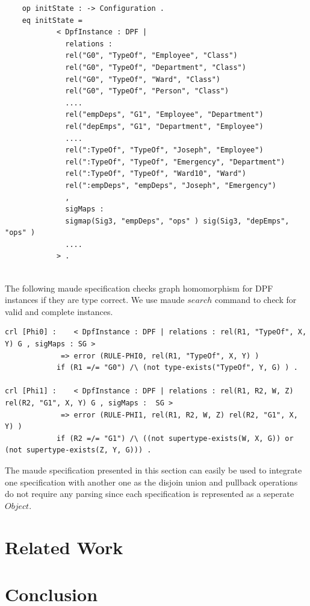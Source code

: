 \documentclass{eceasst}
\begin{document}
\tiny
\begin{verbatim}
	op initState : -> Configuration .
	eq initState = 
			< DpfInstance : DPF | 
			  relations : 
			  rel("G0", "TypeOf", "Employee", "Class")
			  rel("G0", "TypeOf", "Department", "Class")
			  rel("G0", "TypeOf", "Ward", "Class")
			  rel("G0", "TypeOf", "Person", "Class")
			  ....
			  rel("empDeps", "G1", "Employee", "Department")
			  rel("depEmps", "G1", "Department", "Employee")
			  ....			  
			  rel(":TypeOf", "TypeOf", "Joseph", "Employee") 
			  rel(":TypeOf", "TypeOf", "Emergency", "Department") 
			  rel(":TypeOf", "TypeOf", "Ward10", "Ward") 			  
			  rel(":empDeps", "empDeps", "Joseph", "Emergency") 			  
			  ,
			  sigMaps : 
			  sigmap(Sig3, "empDeps", "ops" ) sig(Sig3, "depEmps", "ops" )
			  ....
			> .
 
\end{verbatim}
\normalsize

The following maude specification checks graph homomorphism for DPF instances if they are type correct. We use maude $search$ command to check for valid and complete instances. 


\tiny
\begin{verbatim}
crl [Phi0] :	< DpfInstance : DPF | relations : rel(R1, "TypeOf", X, Y) G , sigMaps : SG > 
			 => error (RULE-PHI0, rel(R1, "TypeOf", X, Y) )
			if (R1 =/= "G0") /\ (not type-exists("TypeOf", Y, G) ) .

crl [Phi1] :	< DpfInstance : DPF | relations : rel(R1, R2, W, Z) rel(R2, "G1", X, Y) G , sigMaps :  SG > 
			 => error (RULE-PHI1, rel(R1, R2, W, Z) rel(R2, "G1", X, Y) )
			if (R2 =/= "G1") /\ ((not supertype-exists(W, X, G)) or (not supertype-exists(Z, Y, G))) .
\end{verbatim}

\normalsize

The maude specification presented in this section can easily be used to integrate one specification with another one as the disjoin union and pullback operations do not require any parsing since 
each specification is represented as a seperate $Object$. 

 
\section{Related Work}



\section{Conclusion}
 


{}
\end{document}
